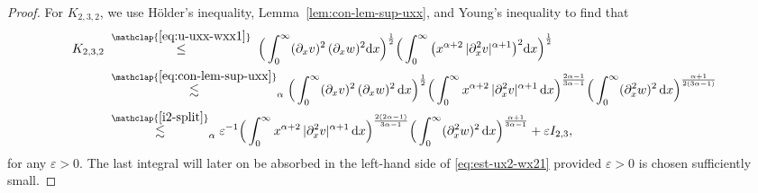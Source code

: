 \documentclass[reqno,12pt]{amsart}
\renewcommand{\d}{\ensuremath{\mathrm{d}}}
\newcommand{\eps}{\ensuremath{\varepsilon}}
\renewcommand{\d}{\ensuremath{{\rm d}}}
\numberwithin{equation}{section}
\begin{document}
\begin{proof}
%
\bigskip
%

For $K_{2,3,2}$, we use H\"older's inequality, Lemma~\ref{lem:con-lem-sup-uxx}, and Young's inequality to find that 
\begin{align}
   K_{2,3,2}
    \; &\stackrel{\mathclap{\eqref{eq:u-uxx-wxx1}}}{\leq} \;  \Big(\int_0^\infty (\partial_x v)^2\, (\partial_x w)^2 \d x\Big)^\frac{1}{2}
    \Big(\int_0^\infty \big(x^{\alpha+2}\, |\partial_x^2 v|^{\alpha+1}\big)^2 \d x\Big)^\frac{1}{2} \nonumber 
    \\
    &\stackrel{\mathclap{\eqref{eq:con-lem-sup-uxx}}}{\lesssim}_{\alpha} \Big(\int_0^\infty (\partial_x v)^2\,(\partial_x w)^2 \, \d x \Big)^{\frac{1}{2}}
    \Big(  \int_0^\infty x^{\alpha +2} \, |\partial_x^2 v|^{\alpha +1} \, \d x\Big)^{\frac{2\alpha-1}{3\alpha-1}}
    \Big( \int_0^\infty (\partial_x^2 w)^2 \, \d x\Big)^{\frac{\alpha+1}{2(3\alpha-1)}} \nonumber 
    \\
    &\stackrel{\mathclap{\eqref{i2-split}}}{\lesssim}_\alpha
    \eps^{-1}\Big(\int_0^\infty x^{\alpha +2} \, |\partial_x^2 v|^{\alpha +1} \, \d x\Big)^{\frac{2(2\alpha-1)}{3\alpha-1}}
    \Big( \int_0^\infty (\partial_x^2 w)^2 \, \d x\Big)^{\frac{\alpha+1}{3\alpha-1}}+  \eps I_{2,3}, \label{eq:est-ux-uxx-w-wx}
\end{align}
%
for any $\eps > 0$. The last integral will later on be absorbed in the left-hand side of \eqref{eq:est-ux2-wx21} provided $\eps > 0$ is chosen sufficiently small.

%
\bigskip
%


\end{proof}
\end{document}
